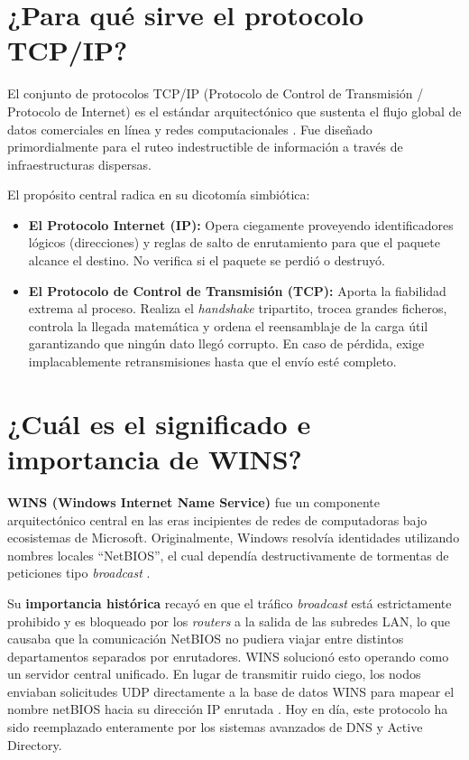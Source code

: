 \documentclass[a4paper,12pt]{article}
\begin{document}
\section{¿Para qué sirve el protocolo TCP/IP?}

El conjunto de protocolos TCP/IP (Protocolo de Control de Transmisión / Protocolo de Internet) es el estándar arquitectónico que sustenta el flujo global de datos comerciales en línea y redes computacionales \cite{ref55}. Fue diseñado primordialmente para el ruteo indestructible de información a través de infraestructuras dispersas.

El propósito central radica en su dicotomía simbiótica:
\begin{itemize}
    \item \textbf{El Protocolo Internet (IP):} Opera ciegamente proveyendo identificadores lógicos (direcciones) y reglas de salto de enrutamiento para que el paquete alcance el destino. No verifica si el paquete se perdió o destruyó.
    \item \textbf{El Protocolo de Control de Transmisión (TCP):} Aporta la fiabilidad extrema al proceso. Realiza el \textit{handshake} tripartito, trocea grandes ficheros, controla la llegada matemática y ordena el reensamblaje de la carga útil garantizando que ningún dato llegó corrupto. En caso de pérdida, exige implacablemente retransmisiones hasta que el envío esté completo.
\end{itemize}

\section{¿Cuál es el significado e importancia de WINS?}

\textbf{WINS (Windows Internet Name Service)} fue un componente arquitectónico central en las eras incipientes de redes de computadoras bajo ecosistemas de Microsoft. Originalmente, Windows resolvía identidades utilizando nombres locales ``NetBIOS'', el cual dependía destructivamente de tormentas de peticiones tipo \textit{broadcast} \cite{ref60}.

Su \textbf{importancia histórica} recayó en que el tráfico \textit{broadcast} está estrictamente prohibido y es bloqueado por los \textit{routers} a la salida de las subredes LAN, lo que causaba que la comunicación NetBIOS no pudiera viajar entre distintos departamentos separados por enrutadores. WINS solucionó esto operando como un servidor central unificado. En lugar de transmitir ruido ciego, los nodos enviaban solicitudes UDP directamente a la base de datos WINS para mapear el nombre netBIOS hacia su dirección IP enrutada \cite{ref60}. Hoy en día, este protocolo ha sido reemplazado enteramente por los sistemas avanzados de DNS y Active Directory.
\end{document}
